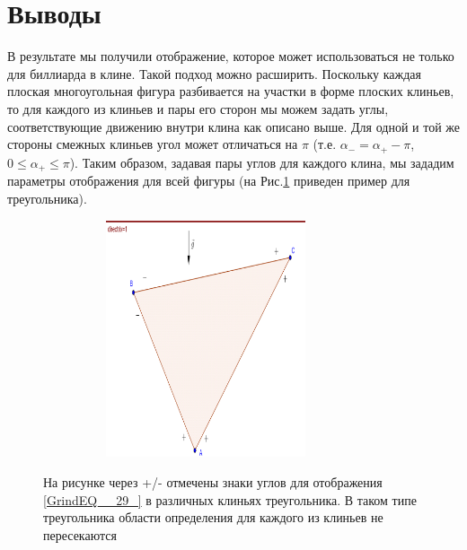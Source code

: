 \documentclass[a4paper]{article}
\begin{document}

\section{Выводы}

         В результате мы получили отображение, которое может использоваться не только для биллиарда в клине. Такой подход  можно расширить. Поскольку каждая плоская многоугольная фигура разбивается на участки в форме плоских клиньев, то для каждого из клиньев и пары его сторон мы можем задать углы, соответствующие движению внутри клина как описано выше. Для одной и той же стороны смежных клиньев угол может отличаться на $\pi $ (т.е. $\alpha _{-} =\alpha _{+} -\pi $, $0\le \alpha _{+} \le \pi $). Таким образом, задавая пары углов для каждого клина, мы зададим параметры отображения для всей фигуры (на Рис.\ref{image12} приведен пример для треугольника).

\begin{figure}[ht]
  \centering
  \includegraphics[width=95.7mm, height=69.9mm, viewport=3mm 4mm 205mm 292mm]{image12}\\
  \caption{На рисунке через +/- отмечены знаки углов для отображения \eqref{GrindEQ__29_} в различных клиньях треугольника. В таком типе треугольника области определения для каждого из клиньев не пересекаются}\label{image12}
\end{figure}
\end{document}
